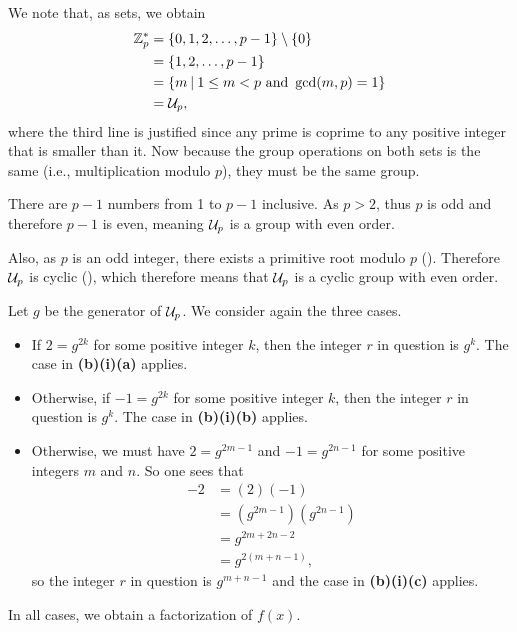 \begin{questions}
\begin{partquestions}{\alph*}
\begin{partquestions}{\roman*}
            \item We note that, as sets, we obtain
            \begin{align*}
                \Z_p^\ast &= \{0, 1, 2, \dots, p-1\} \setminus \{0\}\\
                &= \{1, 2, \dots, p-1\}\\
                &= \left\{m \vert 1 \leq m < p \text{ and } \gcd(m,p) = 1\right\}\\
                &= \Un{p},
            \end{align*}
            where the third line is justified since any prime is coprime to any positive integer that is smaller than it. Now because the group operations on both sets is the same (i.e., multiplication modulo $p$), they must be the same group.
            
            \item There are $p - 1$ numbers from 1 to $p - 1$ inclusive. As $p > 2$, thus $p$ is odd and therefore $p - 1$ is even, meaning $\mathcal{U}_{p}$ is a group with even order.
            
            Also, as $p$ is an odd integer, there exists a primitive root modulo $p$ (). Therefore $\mathcal{U}_{p}$ is cyclic (), which therefore means that $\mathcal{U}_{p}$ is a cyclic group with even order.
            
            \item Let $g$ be the generator of $\mathcal{U}_{p}$. We consider again the three cases.
            \begin{itemize}
                \item If $2 = g^{2k}$ for some positive integer $k$, then the integer $r$ in question is $g^k$. The case in \textbf{(b)(i)(a)} applies.
                \item Otherwise, if $-1 = g^{2k}$ for some positive integer $k$, then the integer $r$ in question is $g^k$. The case in \textbf{(b)(i)(b)} applies.
                \item Otherwise, we must have $2 = g^{2m - 1}$ and $-1 = g^{2n - 1}$ for some positive integers $m$ and $n$. So one sees that
                \begin{align*}
                    -2 &= (2)(-1)\\
                    &= \left(g^{2m-1}\right)\left(g^{2n-1}\right)\\
                    &= g^{2m+2n-2}\\
                    &= g^{2(m+n-1)},
                \end{align*}
                so the integer $r$ in question is $g^{m+n-1}$ and the case in \textbf{(b)(i)(c)} applies.
            \end{itemize}
            In all cases, we obtain a factorization of $f(x)$.
        \end{partquestions}
    \end{partquestions}
\end{questions}
